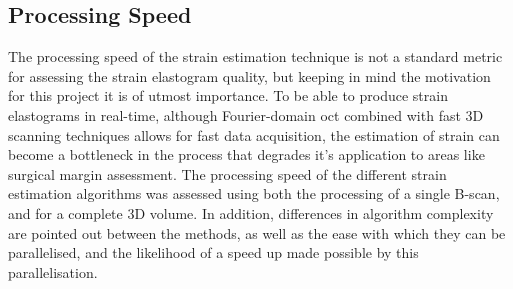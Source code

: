 \subsection{Processing Speed}
The processing speed of the strain estimation technique is not a standard metric for assessing the strain elastogram quality, but keeping in mind the motivation for this project it is of utmost importance. To be able to produce strain elastograms in real-time, although Fourier-domain \ac{oct} combined with fast 3D scanning techniques allows for fast data acquisition, the estimation of strain can become a bottleneck in the process that degrades it's application to areas like surgical margin assessment.
The processing speed of the different strain estimation algorithms was assessed using both the processing of a single B-scan, and for a complete 3D volume. In addition, differences in algorithm complexity are pointed out between the methods, as well as the ease with which they can be parallelised, and the likelihood of a speed up made possible by this parallelisation.
